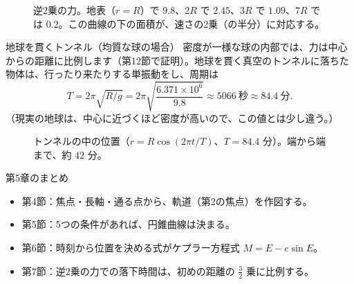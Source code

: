\documentclass[a4paper,11pt,openany]{ltjsbook}
\begin{document}
\begin{figure}[htbp]
\centering
{}
\caption{逆2乗の力。地表（$r=R$）で $9.8$、$2R$ で $2.45$、$3R$ で $1.09$、$7R$ では $0.2$。この曲線の下の面積が、速さの2乗（の半分）に対応する。}
\end{figure}

\begin{examplebox}{地球を貫くトンネル（均質な球の場合）}
密度が一様な球の内部では、力は中心からの距離に比例します（第12節で証明）。地球を貫く真空のトンネルに落ちた物体は、行ったり来たりする単振動をし、周期は
\[
T=2\pi\sqrt{R/g}=2\pi\sqrt{\frac{6.371\times10^6}{9.8}}\approx5066\ \text{秒}\approx84.4\ \text{分}.
\]
（現実の地球は、中心に近づくほど密度が高いので、この値とは少し違う。）
\end{examplebox}

\begin{figure}[htbp]
\centering
{}
\caption{トンネルの中の位置（$r=R\cos(2\pi t/T)$、$T=84.4$ 分）。端から端まで、約 $42$ 分。}
\end{figure}

\begin{pointbox}{第5章のまとめ}
\begin{itemize}[leftmargin=1.5em]
\item 第4節：焦点・長軸・通る点から、軌道（第2の焦点）を作図する。
\item 第5節：5つの条件があれば、円錐曲線は決まる。
\item 第6節：時刻から位置を決める式がケプラー方程式 $M=E-e\sin E$。
\item 第7節：逆2乗の力での落下時間は、初めの距離の $\frac32$ 乗に比例する。
\end{itemize}
\end{pointbox}
\end{document}
